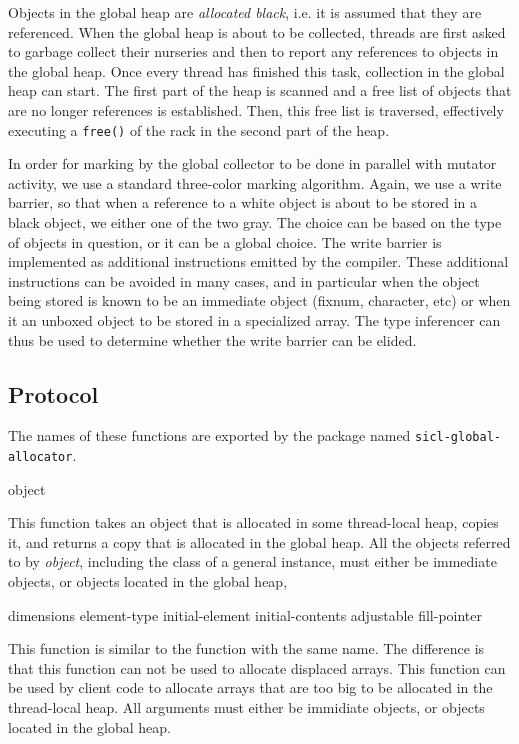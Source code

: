 Objects in the global heap are \emph{allocated black}, i.e. it is
assumed that they are referenced.  When the global heap is about to be
collected, threads are first asked to garbage collect their nurseries
and then to report any references to objects in the global heap.  Once
every thread has finished this task, collection in the global heap can
start.  The first part of the heap is scanned and a free list of
objects that are no longer references is established.  Then, this free
list is traversed, effectively executing a \texttt{free()} of the rack
in the second part of the heap.

In order for marking by the global collector to be done in parallel
with mutator activity, we use a standard three-color marking
algorithm.  Again, we use a write barrier, so that when a reference to
a white object is about to be stored in a black object, we either one
of the two gray.  The choice can be based on the type of objects in
question, or it can be a global choice.  The write barrier is
implemented as additional instructions emitted by the compiler.  These
additional instructions can be avoided in many cases, and in
particular when the object being stored is known to be an immediate
object (fixnum, character, etc) or when it an unboxed object to be
stored in a specialized array.  The type inferencer can thus be used
to determine whether the write barrier can be elided.

\subsection{Protocol}

The names of these functions are exported by the package named
\texttt{sicl-global-allocator}.

 {object}

This function takes an object that is allocated in some thread-local
heap, copies it, and returns a copy that is allocated in the global
heap.  All the objects referred to by \textit{object}, including the
class of a general instance, must either be immediate objects, or
objects located in the global heap,

 {dimensions \key element-type initial-element
  initial-contents adjustable fill-pointer}

This function is similar to the \commonlisp{} function with the same
name.  The difference is that this function can not be used to
allocate displaced arrays.  This function can be used by client code
to allocate arrays that are too big to be allocated in the
thread-local heap.  All arguments must either be immidiate objects, or
objects located in the global heap.

